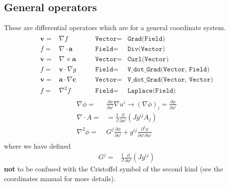 \documentclass[12pt]{article}
\newcommand{\code}[1]{\texttt{#1}}
\def\L{\left}
\def\R{\right}
\def\Rarrow{\rightarrow}
\newcommand{\deriv}[2]{\ensuremath{\frac{\partial #1}{\partial #2}}}
\begin{document}
\subsection{General operators}
%
These are differential operators which are for a general coordinate system.
%
\begin{align}
%
\begin{array}{rclrcl}
\mathbf{v} =& \nabla f &\qquad \code{Vector} =& \code{Grad(Field)} \\
f =& \nabla\cdot\mathbf{a} &\qquad \code{Field} =& \code{Div(Vector)} \\
\mathbf{v} =& \nabla\times\mathbf{a} &\qquad \code{Vector} =&
\code{Curl(Vector)} \\
f =& \mathbf{v}\cdot\nabla g &\qquad \code{Field} =& \code{V\_dot\_Grad(Vector,
Field)} \\
\mathbf{v} =& \mathbf{a}\cdot\nabla\mathbf{c} &\qquad \code{Vector} =&
\code{V\_dot\_Grad(Vector, Vector)} \\
f =& \nabla^2 f &\qquad \code{Field} =& \code{Laplace(Field)}
\end{array}
%
\end{align}
%
\begin{align*}
\nabla\phi =& \deriv{\phi}{u^i}\nabla u^i \Rarrow \L(\nabla\phi\R)_i =
    \deriv{\phi}{u^i} \\ \nabla\cdot A =& =
    \frac{1}{J}\deriv{}{u^i}\L(Jg^{ij}A_j\R) \\ \nabla^2\phi =&
    G^j\deriv{\phi}{u^i} + g^{ij}\frac{\partial^2\phi}{\partial u^i\partial
    u^j} \\
\end{align*}
%
where we have defined
%
\begin{align*}
G^j =& \frac{1}{J}\deriv{}{u^i}\L(Jg^{ij}\R)
\end{align*}
%
\textbf{not} to be confused with the Cristoffel symbol of the second kind (see
the coordinates manual for more details).
%
\end{document}
